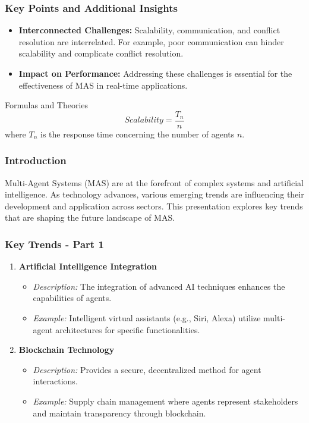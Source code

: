 \documentclass[aspectratio=169]{beamer}
\begin{document}
\begin{frame}[fragile]
    \frametitle{Key Points and Additional Insights}
    \begin{itemize}
        \item \textbf{Interconnected Challenges:} Scalability, communication, and conflict resolution are interrelated. For example, poor communication can hinder scalability and complicate conflict resolution.
        \item \textbf{Impact on Performance:} Addressing these challenges is essential for the effectiveness of MAS in real-time applications.
    \end{itemize}
    
    \begin{block}{Formulas and Theories}
    \begin{equation}
    Scalability = \frac{T_n}{n}
    \end{equation}
    where \( T_n \) is the response time concerning the number of agents \( n \).
    \end{block}
\end{frame}

\begin{frame}[fragile]
    \frametitle{Introduction}
    Multi-Agent Systems (MAS) are at the forefront of complex systems and artificial intelligence. As technology advances, various emerging trends are influencing their development and application across sectors. This presentation explores key trends that are shaping the future landscape of MAS.
\end{frame}

\begin{frame}[fragile]
    \frametitle{Key Trends - Part 1}
    \begin{enumerate}
        \item \textbf{Artificial Intelligence Integration}
            \begin{itemize}
                \item \textit{Description:} The integration of advanced AI techniques enhances the capabilities of agents.
                \item \textit{Example:} Intelligent virtual assistants (e.g., Siri, Alexa) utilize multi-agent architectures for specific functionalities.
            \end{itemize}

        \item \textbf{Blockchain Technology}
            \begin{itemize}
                \item \textit{Description:} Provides a secure, decentralized method for agent interactions.
                \item \textit{Example:} Supply chain management where agents represent stakeholders and maintain transparency through blockchain.
            \end{itemize}
    \end{enumerate}
\end{frame}
\end{document}

